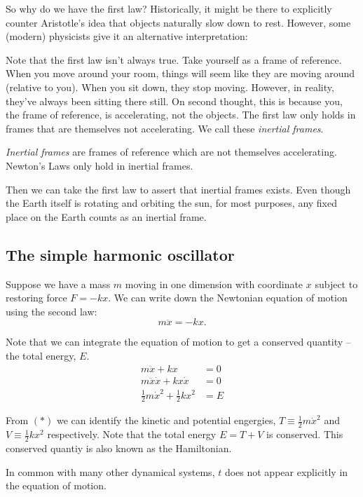 \documentclass[a4paper]{article}
\begin{document}
So why do we have the first law? Historically, it might be there to explicitly counter Aristotle's idea that objects naturally slow down to rest. However, some (modern) physicists give it an alternative interpretation:

Note that the first law isn't always true. Take yourself as a frame of reference. When you move around your room, things will seem like they are moving around (relative to you). When you sit down, they stop moving. However, in reality, they've always been sitting there still. On second thought, this is because you, the frame of reference, is accelerating, not the objects. The first law only holds in frames that are themselves not accelerating. We call these \emph{inertial frames}.

\begin{defi}
  \emph{Inertial frames} are frames of reference which are not themselves accelerating. Newton's Laws only hold in inertial frames.
\end{defi}

Then we can take the first law to assert that inertial frames exists. Even though the Earth itself is rotating and orbiting the sun, for most purposes, any fixed place on the Earth counts as an inertial frame.

\subsection{The simple harmonic oscillator}\label{sec:the-simple-harmonic-oscillator}
Suppose we have a mass $m$ moving in one dimension with coordinate $x$ subject to restoring force $F = -kx$. We can write down the Newtonian equation of motion using the second law:
$$m\ddot{x} = -kx.$$

Note that we can integrate the equation of motion to get a conserved quantity -- the total energy, $E$.
\begin{align*}
  m\ddot{x} + kx &= 0 \\
  m\ddot{x}\dot{x} + kx\dot{x} &= 0 \\
  \frac{1}{2} m\dot{x}^2 + \frac{1}{2} kx^2 &= E \tag{$*$}
\end{align*}

From $(*)$ we can identify the kinetic and potential engergies, $T \equiv  \frac{1}{2} m\dot{x}^2$ and $V \equiv \frac{1}{2} kx^2$ respectively. Note that the total energy $E = T + V$ is conserved. This conserved quantiy is also known as the Hamiltonian.

In common with many other dynamical systems, $t$ does not appear explicitly in the equation of motion.
\end{document}
